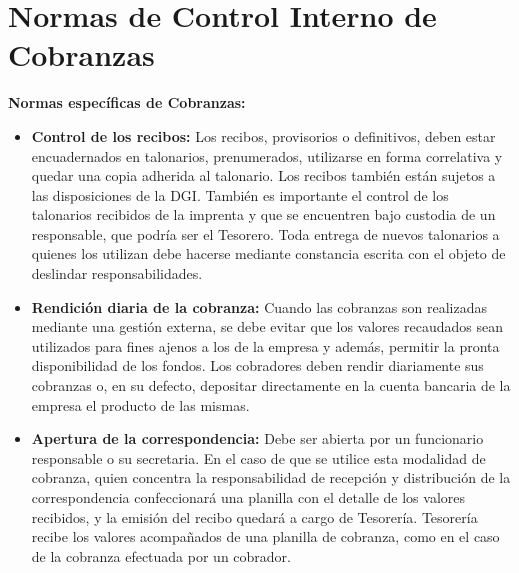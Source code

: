 \pagebreak
\section{Normas de Control Interno de Cobranzas}

\begin{large}
\textbf{Normas específicas de Cobranzas:}
\end{large}

\begin{itemize}

\item \textbf{Control de los recibos:}
Los recibos, provisorios o definitivos, deben estar encuadernados en talonarios, prenumerados,
utilizarse en forma correlativa y quedar una copia adherida al talonario. Los recibos también están sujetos a
las disposiciones de la DGI.
También es importante el control de los talonarios recibidos de la imprenta y que se encuentren bajo
custodia de un responsable, que podría ser el Tesorero. Toda entrega de nuevos talonarios a quienes los
utilizan debe hacerse mediante constancia escrita con el objeto de deslindar responsabilidades.

\item \textbf{Rendición diaria de la cobranza:}
Cuando las cobranzas son realizadas mediante una gestión externa, se debe evitar que los valores
recaudados sean utilizados para fines ajenos a los de la empresa y además, permitir la pronta
disponibilidad de los fondos. Los cobradores deben rendir diariamente sus cobranzas o, en su defecto,
depositar directamente en la cuenta bancaria de la empresa el producto de las mismas.

\item \textbf{Apertura de la correspondencia:}
Debe ser abierta por un funcionario responsable o su secretaria. En el caso de que se utilice esta
modalidad de cobranza, quien concentra la responsabilidad de recepción y distribución de la
correspondencia confeccionará una planilla con el detalle de los valores recibidos, y la emisión del recibo
quedará a cargo de Tesorería. Tesorería recibe los valores acompañados de una planilla de cobranza,
como en el caso de la cobranza efectuada por un cobrador.


\end{itemize}

